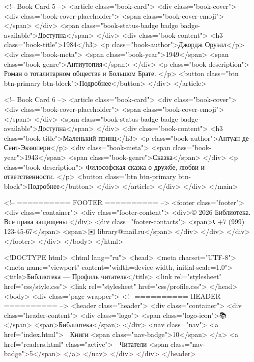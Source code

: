           <!-- Book Card 5 -->
          <article class="book-card">
            <div class="book-cover">
              <div class="book-cover-placeholder">
                <span class="book-cover-emoji">📖</span>
              </div>
              <span class="book-status-badge badge badge-available">Доступна</span>
            </div>
            <div class="book-content">
              <h3 class="book-title">1984</h3>
              <p class="book-author">Джордж Оруэлл</p>
              <div class="book-meta">
                <span class="book-year">1949</span>
                <span class="book-genre">Антиутопия</span>
              </div>
              <p class="book-description">
                Роман о тоталитарном обществе и Большом Брате.
              </p>
              <button class="btn btn-primary btn-block">Подробнее</button>
            </div>
          </article>

          <!-- Book Card 6 -->
          <article class="book-card">
            <div class="book-cover">
              <div class="book-cover-placeholder">
                <span class="book-cover-emoji">📖</span>
              </div>
              <span class="book-status-badge badge badge-available">Доступна</span>
            </div>
            <div class="book-content">
              <h3 class="book-title">Маленький принц</h3>
              <p class="book-author">Антуан де Сент-Экзюпери</p>
              <div class="book-meta">
                <span class="book-year">1943</span>
                <span class="book-genre">Сказка</span>
              </div>
              <p class="book-description">
                Философская сказка о дружбе, любви и ответственности.
              </p>
              <button class="btn btn-primary btn-block">Подробнее</button>
            </div>
          </article>
        </div>
      </div>
    </main>

    <!-- ========== FOOTER ========== -->
    <footer class="footer">
      <div class="container">
        <div class="footer-content">
          <div>© 2026 Библиотека. Все права защищены.</div>
          <div class="footer-contacts">
            <span>📞 +7 (999) 123-45-67</span>
            <span>✉️ library@mail.ru</span>
          </div>
        </div>
      </div>
    </footer>
  </div>
</body>
</html>

<!DOCTYPE html>
<html lang="ru">
<head>
  <meta charset="UTF-8">
  <meta name="viewport" content="width=device-width, initial-scale=1.0">
  <title>Библиотека — Профиль читателя</title>
  <link rel="stylesheet" href="css/style.css">
  <link rel="stylesheet" href="css/profile.css">
</head>
<body>
  <div class="page-wrapper">
    <!-- ========== HEADER ========== -->
    <header class="header">
      <div class="container">
        <div class="header-content">
          <div class="logo">
            <span class="logo-icon">📚</span>
            <span>Библиотека</span>
          </div>
          <nav class="nav">
            <a href="index.html">
              📖 Книги
              <span class="nav-badge">10</span>
            </a>
            <a href="readers.html" class="active">
              👤 Читатели
              <span class="nav-badge">5</span>
            </a>
          </nav>
        </div>
      </div>
    </header>

